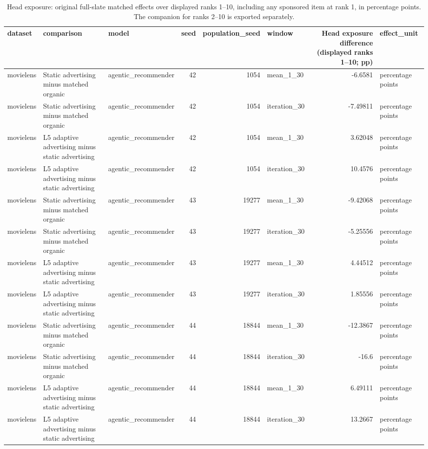 \begin{table}[htbp!]
\centering
\small
\setlength{\tabcolsep}{3pt}
\renewcommand{\arraystretch}{1.1}
\begin{tabular}{lllrrlrl}
\hline
dataset & comparison & model & seed & population\_seed & window & Head exposure difference (displayed ranks 1–10; pp) & effect\_unit \\
\hline
movielens & Static advertising minus matched organic & agentic\_recommender & 42 & 1054 & mean\_1\_30 & -6.6581 & percentage points \\
movielens & Static advertising minus matched organic & agentic\_recommender & 42 & 1054 & iteration\_30 & -7.49811 & percentage points \\
movielens & L5 adaptive advertising minus static advertising & agentic\_recommender & 42 & 1054 & mean\_1\_30 & 3.62048 & percentage points \\
movielens & L5 adaptive advertising minus static advertising & agentic\_recommender & 42 & 1054 & iteration\_30 & 10.4576 & percentage points \\
movielens & Static advertising minus matched organic & agentic\_recommender & 43 & 19277 & mean\_1\_30 & -9.42068 & percentage points \\
movielens & Static advertising minus matched organic & agentic\_recommender & 43 & 19277 & iteration\_30 & -5.25556 & percentage points \\
movielens & L5 adaptive advertising minus static advertising & agentic\_recommender & 43 & 19277 & mean\_1\_30 & 4.44512 & percentage points \\
movielens & L5 adaptive advertising minus static advertising & agentic\_recommender & 43 & 19277 & iteration\_30 & 1.85556 & percentage points \\
movielens & Static advertising minus matched organic & agentic\_recommender & 44 & 18844 & mean\_1\_30 & -12.3867 & percentage points \\
movielens & Static advertising minus matched organic & agentic\_recommender & 44 & 18844 & iteration\_30 & -16.6 & percentage points \\
movielens & L5 adaptive advertising minus static advertising & agentic\_recommender & 44 & 18844 & mean\_1\_30 & 6.49111 & percentage points \\
movielens & L5 adaptive advertising minus static advertising & agentic\_recommender & 44 & 18844 & iteration\_30 & 13.2667 & percentage points \\
\hline
\end{tabular}
\caption{Head exposure: original full-slate matched effects over displayed ranks 1--10, including any sponsored item at rank 1, in percentage points. The companion for ranks 2--10 is exported separately.}
\label{chap:results:tab:rq1_advertising_head_exposure_ranks_1_10_effects}
\end{table}
